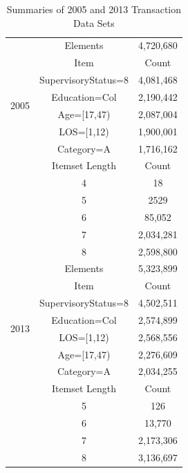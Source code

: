 \documentclass{article}
\begin{document}
    \begin{center}
        \begin{table}
            \centering
            \begin{tabular}{ |c|c|c| }
                \hline
                \multirow{8}{*}{2005} & Elements & 4,720,680 \\
                \cline{2-3}
                & Item & Count \\
                \cline{2-3}
                & SupervisoryStatus=8 & 4,081,468 \\
                & Education=Col & 2,190,442 \\
                & Age=[17,47) & 2,087,004 \\
                & LOS=[1,12) & 1,900,001 \\
                & Category=A & 1,716,162 \\
                \cline{2-3}
                & Itemset Length & Count \\
                \cline{2-3}
                & 4 & 18 \\
                & 5 & 2529 \\
                & 6 & 85,052 \\
                & 7 & 2,034,281 \\
                & 8 & 2,598,800 \\
                \hline
                \multirow{8}{*}{2013} & Elements & 5,323,899 \\
                \cline{2-3}
                & Item & Count \\
                \cline{2-3}
                & SupervisoryStatus=8 & 4,502,511 \\
                & Education=Col & 2,574,899 \\
                & LOS=[1,12) & 2,568,556 \\
                & Age=[17,47) & 2,276,609 \\
                & Category=A & 2,034,255 \\
                \cline{2-3}
                & Itemset Length & Count \\
                \cline{2-3}
                & 5 & 126 \\
                & 6 & 13,770 \\
                & 7 & 2,173,306 \\
                & 8 & 3,136,697 \\
                \hline
            \end{tabular}
            \caption{Summaries of 2005 and 2013 Transaction Data Sets}
            \label{tab:4}
        \end{table}
    \end{center}
\end{document}
